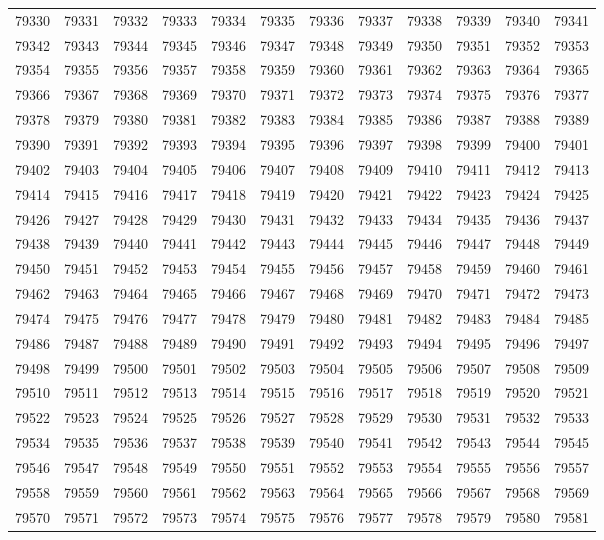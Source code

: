 \begin{center}
\begin{longtable}{llllllllllll}
79330 &79331 &79332 &79333 &79334 &79335 &79336 &79337 &79338 &79339 &79340 &79341 \\
79342 &79343 &79344 &79345 &79346 &79347 &79348 &79349 &79350 &79351 &79352 &79353 \\
79354 &79355 &79356 &79357 &79358 &79359 &79360 &79361 &79362 &79363 &79364 &79365 \\
79366 &79367 &79368 &79369 &79370 &79371 &79372 &79373 &79374 &79375 &79376 &79377 \\
79378 &79379 &79380 &79381 &79382 &79383 &79384 &79385 &79386 &79387 &79388 &79389 \\
79390 &79391 &79392 &79393 &79394 &79395 &79396 &79397 &79398 &79399 &79400 &79401 \\
79402 &79403 &79404 &79405 &79406 &79407 &79408 &79409 &79410 &79411 &79412 &79413 \\
79414 &79415 &79416 &79417 &79418 &79419 &79420 &79421 &79422 &79423 &79424 &79425 \\
79426 &79427 &79428 &79429 &79430 &79431 &79432 &79433 &79434 &79435 &79436 &79437 \\
79438 &79439 &79440 &79441 &79442 &79443 &79444 &79445 &79446 &79447 &79448 &79449 \\
79450 &79451 &79452 &79453 &79454 &79455 &79456 &79457 &79458 &79459 &79460 &79461 \\
79462 &79463 &79464 &79465 &79466 &79467 &79468 &79469 &79470 &79471 &79472 &79473 \\
79474 &79475 &79476 &79477 &79478 &79479 &79480 &79481 &79482 &79483 &79484 &79485 \\
79486 &79487 &79488 &79489 &79490 &79491 &79492 &79493 &79494 &79495 &79496 &79497 \\
79498 &79499 &79500 &79501 &79502 &79503 &79504 &79505 &79506 &79507 &79508 &79509 \\
79510 &79511 &79512 &79513 &79514 &79515 &79516 &79517 &79518 &79519 &79520 &79521 \\
79522 &79523 &79524 &79525 &79526 &79527 &79528 &79529 &79530 &79531 &79532 &79533 \\
79534 &79535 &79536 &79537 &79538 &79539 &79540 &79541 &79542 &79543 &79544 &79545 \\
79546 &79547 &79548 &79549 &79550 &79551 &79552 &79553 &79554 &79555 &79556 &79557 \\
79558 &79559 &79560 &79561 &79562 &79563 &79564 &79565 &79566 &79567 &79568 &79569 \\
79570 &79571 &79572 &79573 &79574 &79575 &79576 &79577 &79578 &79579 &79580 &79581 \\

\end{longtable}
\end{center}
